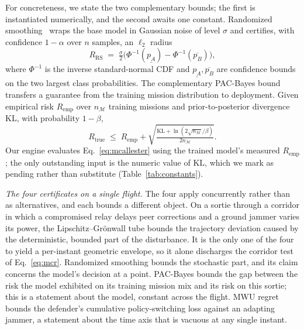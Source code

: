For concreteness, we state the two complementary bounds; the first is
instantiated numerically, and the second awaits one constant. Randomized smoothing~\cite{cohen2019smoothing} wraps the base model
in Gaussian noise of level $\sigma$ and certifies, with confidence $1-\alpha$
over $n$ samples, an $\ell_2$ radius
\begin{equation}
\label{eq:cohen}
R_{\mathrm{RS}} \;=\; \tfrac{\sigma}{2}\big(\Phi^{-1}(\underline{p_A})-\Phi^{-1}(\overline{p_B})\big),
\end{equation}
where $\Phi^{-1}$ is the inverse standard-normal CDF and
$\underline{p_A},\overline{p_B}$ are confidence bounds on the two largest class
probabilities. The complementary PAC-Bayes
bound~\cite{mcallester1999pac,viallard2021pacbayes} transfers a guarantee from
the training mission distribution to deployment. Given empirical risk
$R_{\mathrm{emp}}$ over $n_{\mathcal{M}}$ training missions and
prior-to-posterior divergence $\mathrm{KL}$, with probability $1-\beta$,
\begin{equation}
\label{eq:mcallester}
R_{\mathrm{true}} \;\le\; R_{\mathrm{emp}} + \sqrt{\tfrac{\mathrm{KL}+\ln(2\sqrt{n_{\mathcal{M}}}/\beta)}{2n_{\mathcal{M}}}}.
\end{equation}
Our engine evaluates Eq.~\eqref{eq:mcallester} using the trained model's measured
$R_{\mathrm{emp}}$; the only outstanding input is the numeric value of $\mathrm{KL}$,
which we mark as pending rather than substitute (Table~\ref{tab:constants}).


\emph{The four certificates on a single flight.} The four apply concurrently
rather than as alternatives, and each bounds a different object. On a
sortie through a corridor in which a compromised relay delays peer corrections
and a ground jammer varies its power, the Lipschitz--Gr\"onwall tube bounds the
trajectory deviation caused by the deterministic, bounded part of the
disturbance. It is the only one of the four to yield a per-instant geometric
envelope, so it alone discharges the corridor test of Eq.~\eqref{eq:mcr}.
Randomized smoothing bounds the stochastic part, and its claim concerns the
model's decision at a point. PAC-Bayes bounds the gap between the risk the model
exhibited on its training mission mix and its risk on this sortie; this is a
statement about the model, constant across the flight. MWU regret bounds
the defender's cumulative policy-switching loss against an adapting jammer, a
statement about the time axis that is vacuous at any single instant.

